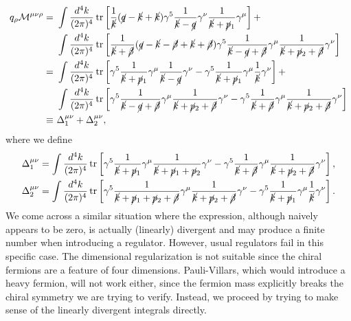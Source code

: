 \documentclass[aps,prb,superscriptaddress,nofootinbib]{revtex4}
\def \tr{\operatorname{tr}}
\begin{document}
\begin{equation}
\begin{aligned}
	q_\rho \mathcal{M}^{\mu\nu\rho} 
	=&\ \int \frac{d^{4} k}{(2 \pi)^{4}} \tr\left[\frac{1}{\cancel k} (\cancel{q}-\cancel{k}+\cancel{k}) \gamma^{5} \frac{1}{\cancel k-\cancel q} \gamma^{\nu} \frac{1}{\cancel k+\cancel p_{1}} \gamma^\mu \right] + \\
	&\ \int \frac{d^{4} k}{(2 \pi)^{4}} \tr\left[\frac{1}{\cancel k +\cancel \beta} (\cancel{q}-\cancel{k}-\cancel \beta +\cancel{k} +\cancel\beta) \gamma^{5} \frac{1}{\cancel k-\cancel q+\cancel\beta} \gamma^{\mu} \frac{1}{\cancel k+\cancel p_{2}+\cancel \beta} \gamma^\nu \right] \\
	=&\ \int \frac{d^{4} k}{(2 \pi)^{4}} \tr\left[\gamma^{5} \frac{1}{\cancel k+\cancel p_{1}} \gamma^\mu \frac{1}{\cancel k-\cancel q} \gamma^{\nu}  -  \gamma^{5}   \frac{1}{\cancel k+\cancel p_{1}} \gamma^\mu \frac{1}{\cancel k} \gamma^{\nu} \right]+ \\
	&\ \int \frac{d^{4} k}{(2 \pi)^{4}} \tr\left[\gamma^{5} \frac{1}{\cancel k-\cancel q+\cancel\beta} \gamma^{\mu} \frac{1}{\cancel k+\cancel p_{2}+\cancel \beta} \gamma^\nu -\gamma^5\frac{1}{\cancel k+\cancel\beta}\gamma^\mu\frac{1}{\cancel k+\cancel p_2+\cancel\beta}\gamma^\nu\right] \\
	\equiv &\ \Delta^{\mu\nu}_1 + \Delta^{\mu\nu}_2,
\end{aligned}
\end{equation}
where we define
\begin{equation}\label{eq:AN-Tri-div-int}
\begin{aligned}
	\Delta^{\mu\nu}_1 &= \int \frac{d^{4} k}{(2 \pi)^{4}} \tr\left[
		\gamma^{5} \frac{1}{\cancel k+\cancel p_{1}} \gamma^\mu \frac{1}{\cancel k+\cancel p_1+\cancel p_2} \gamma^{\nu} -
		\gamma^5\frac{1}{\cancel k+\cancel\beta}\gamma^\mu\frac{1}{\cancel k+\cancel p_2+\cancel\beta}\gamma^\nu 
	\right], \\
	\Delta^{\mu\nu}_2 &= \int \frac{d^{4} k}{(2 \pi)^{4}} \tr\left[
		\gamma^{5} \frac{1}{\cancel k+\cancel p_1 +\cancel p_2+\cancel\beta} \gamma^{\mu} \frac{1}{\cancel k+\cancel p_{2}+\cancel \beta} \gamma^\nu -
		\gamma^{5}   \frac{1}{\cancel k+\cancel p_{1}} \gamma^\mu \frac{1}{\cancel k} \gamma^{\nu}
	\right].
\end{aligned}
\end{equation}
We come across a similar situation where the expression, although naively appears to be zero, is actually (linearly) divergent and may produce a finite number when introducing a regulator.
However, usual regulators fail in this specific case.
The dimensional regularization is not suitable since the chiral fermions are a feature of four dimensions.
Pauli-Villars, which would introduce a heavy fermion, will not work either, since the fermion mass explicitly breaks the chiral symmetry we are trying to verify. 
Instead, we proceed by trying to make sense of the linearly divergent integrals directly.
\end{document}
